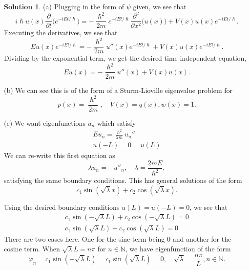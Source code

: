 \documentclass[12pt]{article}
\newcommand{\bbN}{\mathbb{N}}
\renewcommand{\phi}{\varphi}
\theoremstyle{definition}
\newtheorem{sol}{Solution}
\theoremstyle{remark}
\begin{document}
\begin{sol}
    (a) Plugging in the form of $\psi$ given, we see that
     \begin{equation*}
         i \hslash u(x) \frac{\partial }{\partial t}\Big( e^{-i E t / \hslash} \Big) = - \frac{\hslash^{2}}{2m} e^{-i E t / \hslash} \frac{\partial^{2}}{\partial x^{2}}\Big( u(x) \Big) + V(x) u(x) e^{-iEt / \hslash}.
    \end{equation*}
    Executing the derivatives, we see that
    \begin{equation*}
       E u(x) e^{- i E t / \hslash} = - \frac{\hslash^{2}}{2m} u''(x) e^{- i E t / \hslash} + V(x) u(x) e^{-i E t / \hslash}.
    \end{equation*}
    Dividing by the exponential term, we get the desired time independent equation,
    \begin{equation*}
        E u(x) = - \frac{\hslash^{2}}{2m} u''(x) + V(x) u(x).
    \end{equation*}


    (b) We can see this is of the form of a Sturm-Lioville eigenvalue problem for
    \begin{equation*}
        p(x) = \frac{\hslash^{2}}{2m}, \quad V(x) = q(x), w(x) = 1.
    \end{equation*}

    (c) We want eigenfunctions $u_{n}$ which satisfy 
    \begin{align*}
        E u_{n} = \frac{\hslash^{2}}{2m} u_{n}''\\
        u(-L) = 0 = u(L)
    \end{align*}
    We can re-write this first equation as
\begin{equation*}
    \lambda u_{n} = - u''_{n}, \quad \lambda = \frac{2mE}{\hslash^{2}},
\end{equation*}
satisfying the same boundary conditions. This has general solutions of the form
    \begin{equation*}
        c_{1} \sin( \sqrt{\lambda} x) + c_{2} \cos( \sqrt{\lambda} x).
    \end{equation*}
  \end{sol}
  Using the desired boundary conditions $u(L) = u(-L) = 0$, we see that
  \begin{align*}
      c_{1} \sin(-\sqrt{\lambda}  L) + c_{2} \cos( -\sqrt{\lambda} L) = 0\\
      c_{1} \sin(\sqrt{\lambda}  L) + c_{2} \cos(\sqrt{\lambda} L) = 0
  \end{align*}
  There are two cases here. One for the sine term being 0 and another for the cosine term. When $\sqrt{\lambda} L = n\pi$ for $n\in\bbN$, we have eigenfunction of the form 
  \begin{equation*}
      \phi_{n} = c_{1} \sin( -\sqrt{\lambda} L ) = c_{1} \sin( \sqrt{\lambda} L ) = 0, \quad \sqrt{\lambda} = \frac{n\pi}{L}, n\in\bbN.
  \end{equation*}
\end{document}
